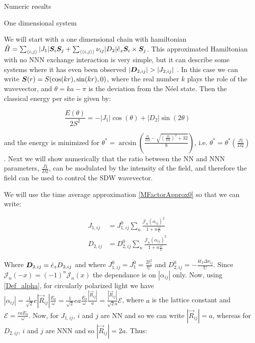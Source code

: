\begin{section}{Numeric results}
\label{Numerics}

\begin{subsection}{One dimensional system}

We will start with a one dimensional chain with hamiltonian $\hat{H} = \sum_{\langle i,j \rangle} |J_1| \boldsymbol{S}_i\boldsymbol{S}_j + \sum_{\langle \langle i,j \rangle \rangle} \nu_{ij}|D_2|\hat{e}_z\boldsymbol{S}_i \times \boldsymbol{S}_j$. This approximated Hamiltonian with no NNN exchange interaction is very simple, but it can describe some systems where it has even been observed $|\boldsymbol{D}_{2,ij}| > |J_{2,ij}|$ \cite{Chen2018}. In this case we can write $\boldsymbol{S}(r) = S(\cos(kr), \sin(kr), 0)$, where the real number $k$ plays the role of the wavevector, and $\theta = ka-\pi$ is the deviation from the N\'eel state. Then the classical energy per site is given by:

\begin{equation}
\frac{E(\theta)}{2S^2} = -|J_1|\cos(\theta) + |D_2|\sin(2 \theta)
\end{equation}

and the energy is minimized for $\theta^* = \arcsin(\frac{\frac{J1}{D2} - \sqrt{(\frac{J1}{D2})^2+32}}{8})$, i.e. $\theta^* = \theta^*(\frac{J1}{D2})$. Next we will show numerically that the ratio between the NN and NNN parameters, $\frac{J1}{D2}$, can be modulated by the intensity of the field, and therefore the field can be used to control the SDW wavevector. 

We will use the time average approximation \ref{MFactorApprox0} so that we can write:

\begin{align}
J_{1,ij} &= J_{1,ij}^0  \sum_{n} \frac{\mathcal{J}_n(\alpha_{ij})^2}{1+n\frac{\omega}{\text{U}}} \\
D_{2,ij} &= D_{2,ij}^0  \sum_{n} \frac{\mathcal{J}_n(\alpha_{ij})^2}{1+n\frac{\omega}{\text{U}}}
\end{align}

Where $\boldsymbol{D}_{2,ij} = \hat{e}_z D_{2,ij}$ and where $J_{1,ij}^0 = J_{1}^0 = \frac{2t_1^2}{\text{U}}$ and $D_{2,ij}^0 = -\frac{4t_2\Delta\nu_{ij}}{\text{U}}$. Since $\mathcal{J}_n(-x) = (-1)^n\mathcal{J}_n(x)$ the dependance is on $|\alpha_{ij}|$ only. Now, using \ref{Def_alpha}, for circularly polarized light we have $|\alpha_{ij}| = \frac{1}{\sqrt{2}}e|\vec{R}_{ij}| \frac{E_0}{\omega} = \frac{1}{\sqrt{2}}ea \frac{E_0}{\omega} \frac{|\vec{R}_{ij}|}{a} = \frac{|\vec{R}_{ij}|}{\sqrt{2}a} \mathcal{E}$, where $a$ is the lattice constant and $\mathcal{E} = \frac{eaE_0}{\omega}$. Now, for $J_{1,ij}$, $i$ and $j$ are NN and so we can write $|\vec{R}_{ij}|=a$, whereas for $D_{2,ij}$, $i$ and $j$ are NNN and so $|\vec{R}_{ij}|=2a$. Thus:


\end{subsection}
\end{section}
